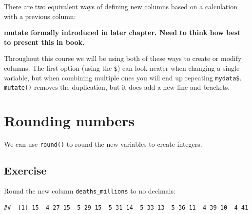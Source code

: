 \documentclass[12pt,]{krantz}
\makeatletter
\newenvironment{Shaded}{\begin{snugshade}}{\end{snugshade}}
\newcommand{\CommentTok}[1]{\textcolor[rgb]{0.56,0.35,0.01}{\textit{#1}}}
\newcommand{\DataTypeTok}[1]{\textcolor[rgb]{0.13,0.29,0.53}{#1}}
\newcommand{\DecValTok}[1]{\textcolor[rgb]{0.00,0.00,0.81}{#1}}
\newcommand{\KeywordTok}[1]{\textcolor[rgb]{0.13,0.29,0.53}{\textbf{#1}}}
\newcommand{\NormalTok}[1]{#1}
\newcommand{\OperatorTok}[1]{\textcolor[rgb]{0.81,0.36,0.00}{\textbf{#1}}}
\newcommand{\StringTok}[1]{\textcolor[rgb]{0.31,0.60,0.02}{#1}}
\newenvironment{kframe}{%
\medskip{}
\setlength{\fboxsep}{.8em}
 \def\at@end@of@kframe{}%
 \ifinner\ifhmode%
  \def\at@end@of@kframe{\end{minipage}}%
  \begin{minipage}{\columnwidth}%
 \fi\fi%
 \def\FrameCommand##1{\hskip\@totalleftmargin \hskip-\fboxsep
 \colorbox{shadecolor}{##1}\hskip-\fboxsep
     \hskip-\linewidth \hskip-\@totalleftmargin \hskip\columnwidth}%
 \MakeFramed {\advance\hsize-\width
   \@totalleftmargin\z@ \linewidth\hsize
   \@setminipage}}%
 {\par\unskip\endMakeFramed%
 \at@end@of@kframe}
\renewenvironment{Shaded}{\begin{kframe}}{\end{kframe}}
\theoremstyle{definition}
\theoremstyle{definition}
\theoremstyle{definition}
\theoremstyle{remark}
\makeatother
\begin{document}
There are two equivalent ways of defining new columns based on a
calculation with a previous column:

\textbf{mutate formally introduced in later chapter. Need to think how
best to present this in book.}

\begin{Shaded}
\end{Shaded}

Throughout this course we will be using both of these ways to create or
modify columns. The first option (using the \texttt{\$}) can look neater
when changing a single variable, but when combining multiple ones you
will end up repeating \texttt{mydata\$}. \texttt{mutate()} removes the
duplication, but it does add a new line and brackets.

\hypertarget{rounding-numbers}{%
\section{Rounding numbers}\label{rounding-numbers}}

We can use \texttt{round()} to round the new variables to create
integers.

\hypertarget{exercise-5}{%
\subsection{Exercise}\label{exercise-5}}

Round the new column \texttt{deaths\_millions} to no decimals:

\begin{verbatim}
##  [1] 15  4 27 15  5 29 15  5 31 14  5 33 13  5 36 11  4 39 10  4 41
\end{verbatim}
\end{document}
